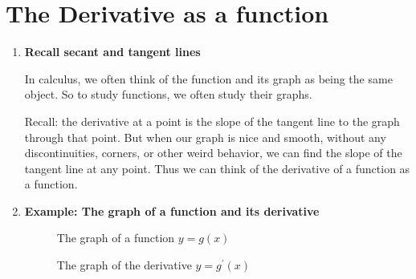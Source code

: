 \section{The Derivative as a function}
\begin{enumerate}
    \item \textbf{Recall secant and tangent lines}

        In calculus, we often think of the function and its graph as being the same object. So to study functions, we often study their graphs.

        Recall: the derivative at a point is the slope of the tangent line to the graph through that point. But when our graph is nice and smooth, without any discontinuities, corners, or other weird behavior, we can find the slope of the tangent line at any point. Thus we can think of the derivative of a function as a function.
    \item \textbf{Example: The graph of a function and its derivative}
        \begin{figure}[H]
            \centering
            \caption{The graph of a function $y=g(x)$}
        \end{figure}
        \begin{figure}[H]
            \centering
            \caption{The graph of the derivative $y=g^\prime (x)$}
        \end{figure}
\end{enumerate}

